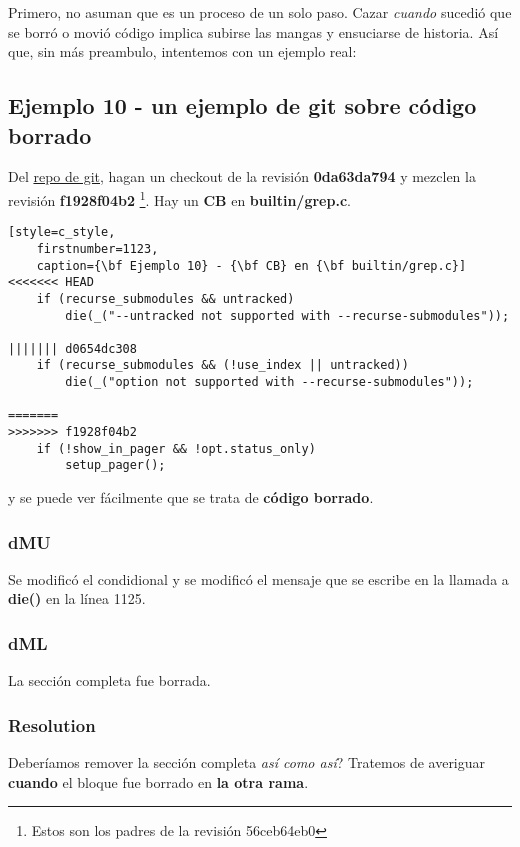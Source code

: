 Primero, no asuman que es un proceso de un solo paso. Cazar {\it cuando} sucedió que se borró o movió código
implica subirse las mangas y ensuciarse de historia. Así que, sin más preambulo, intentemos con un ejemplo real:

\subsection{Ejemplo 10 - un ejemplo de git sobre código borrado}
\label{example_10}

Del \href{git_repo}{repo de git}, hagan un checkout de la revisión {\bf 0da63da794} y mezclen la revisión {\bf f1928f04b2}
\footnote{Estos son los padres de la revisión 56ceb64eb0}. Hay un {\bf CB} en {\bf builtin/grep.c}.

\begin{lstlisting}[style=c_style,
	firstnumber=1123,
	caption={\bf Ejemplo 10} - {\bf CB} en {\bf builtin/grep.c}]
<<<<<<< HEAD
	if (recurse_submodules && untracked)
		die(_("--untracked not supported with --recurse-submodules"));

||||||| d0654dc308
	if (recurse_submodules && (!use_index || untracked))
		die(_("option not supported with --recurse-submodules"));

=======
>>>>>>> f1928f04b2
	if (!show_in_pager && !opt.status_only)
		setup_pager();
\end{lstlisting}

y se puede ver fácilmente que se trata de {\bf código borrado}.

\subsubsection{dMU}
Se modificó el condidional y se modificó el mensaje que se escribe en la llamada a {\bf die()} en la línea 1125.

\subsubsection{dML}
La sección completa fue borrada.

\subsubsection{Resolution}
Deberíamos remover la sección completa {\it así como así}? Tratemos de averiguar {\bf cuando} el bloque fue borrado en
{\bf la otra rama}.

